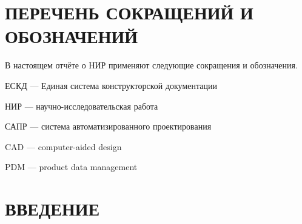 \section*{ПЕРЕЧЕНЬ СОКРАЩЕНИЙ И ОБОЗНАЧЕНИЙ}

В настоящем отчёте о НИР применяют следующие сокращения и обозначения.

ЕСКД — Единая система конструкторской документации

НИР — научно-исследовательская работа

САПР — система автоматизированного проектирования

CAD — computer-aided design

PDM — product data management

\section*{ВВЕДЕНИЕ}
